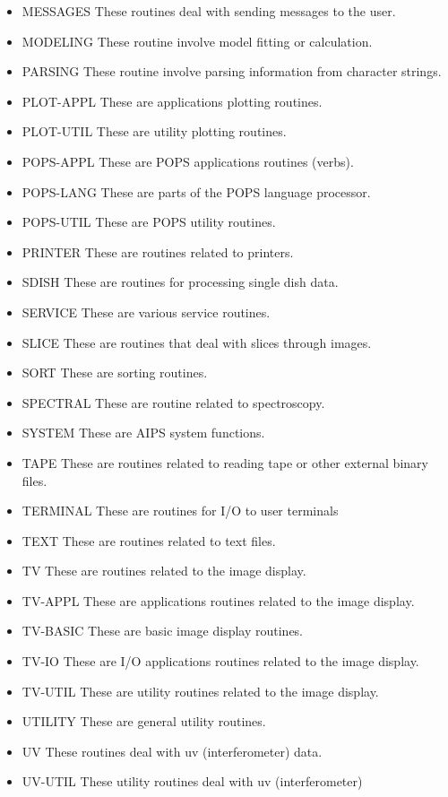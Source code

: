 \begin{itemize}
\item MESSAGES  These routines deal with sending messages to the user.
\item MODELING  These routine involve model fitting or calculation.
\item PARSING  These routine involve parsing information from
character strings.
\item PLOT-APPL  These are applications plotting routines.
\item PLOT-UTIL  These are utility plotting routines.
\item POPS-APPL  These are POPS applications routines (verbs).
\item POPS-LANG  These are parts of the POPS language processor.
\item POPS-UTIL  These are POPS utility routines.
\item PRINTER  These are routines related to printers.
\item SDISH  These are routines for processing single dish data.
\item SERVICE  These are various service routines.
\item SLICE  These are routines that deal with slices through images.
\item SORT  These are sorting routines.
\item SPECTRAL  These are routine related to spectroscopy.
\item SYSTEM  These are AIPS system functions.
\item TAPE  These are routines related to reading tape or other
external binary files.
\item TERMINAL  These are routines for I/O to user terminals
\item TEXT  These are routines related to text files.
\item TV  These are routines related to the image display.
\item TV-APPL  These are applications routines related to the image
display.
\item TV-BASIC  These are basic image display routines.
\item TV-IO  These are I/O applications routines related to the image
display.
\item TV-UTIL  These are utility routines related to the image
display.
\item UTILITY  These are general utility routines.
\item UV  These routines deal with uv (interferometer) data.
\item UV-UTIL  These utility routines deal with uv (interferometer)

\end{itemize}
